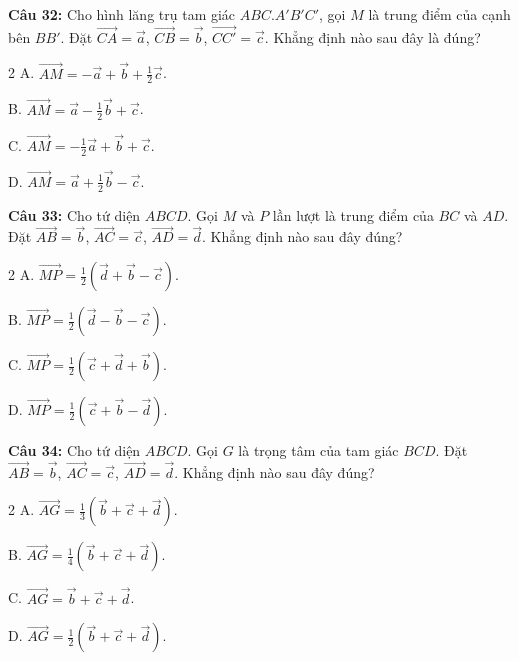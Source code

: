\documentclass[12pt]{article}
\begin{document}
	\vspace{0.2cm}
	\noindent \textbf{Câu 32:} Cho hình lăng trụ tam giác $ABC.A'B'C'$, gọi $M$ là trung điểm của cạnh bên $BB'$. Đặt $\overrightarrow{CA} = \vec{a}$, $\overrightarrow{CB} = \vec{b}$, $\overrightarrow{CC'} = \vec{c}$. Khẳng định nào sau đây là đúng?
	\begin{multicols}{2}
		A. $\overrightarrow{AM} = -\vec{a} + \vec{b} + \frac{1}{2}\vec{c}$. \par
		B. $\overrightarrow{AM} = \vec{a} - \frac{1}{2}\vec{b} + \vec{c}$. \par
		C. $\overrightarrow{AM} = -\frac{1}{2}\vec{a} + \vec{b} + \vec{c}$. \par
		D. $\overrightarrow{AM} = \vec{a} + \frac{1}{2}\vec{b} - \vec{c}$.
	\end{multicols}
	
	\vspace{0.2cm}
	\noindent \textbf{Câu 33:} Cho tứ diện $ABCD$. Gọi $M$ và $P$ lần lượt là trung điểm của $BC$ và $AD$. Đặt $\overrightarrow{AB} = \vec{b}$, $\overrightarrow{AC} = \vec{c}$, $\overrightarrow{AD} = \vec{d}$. Khẳng định nào sau đây đúng?
	\begin{multicols}{2}
		A. $\overrightarrow{MP} = \frac{1}{2}(\vec{d} + \vec{b} - \vec{c})$. \par
		B. $\overrightarrow{MP} = \frac{1}{2}(\vec{d} - \vec{b} - \vec{c})$. \par
		C. $\overrightarrow{MP} = \frac{1}{2}(\vec{c} + \vec{d} + \vec{b})$. \par
		D. $\overrightarrow{MP} = \frac{1}{2}(\vec{c} + \vec{b} - \vec{d})$.
	\end{multicols}
	
	\vspace{0.2cm}
	\noindent \textbf{Câu 34:} Cho tứ diện $ABCD$. Gọi $G$ là trọng tâm của tam giác $BCD$. Đặt $\overrightarrow{AB} = \vec{b}$, $\overrightarrow{AC} = \vec{c}$, $\overrightarrow{AD} = \vec{d}$. Khẳng định nào sau đây đúng?
	\begin{multicols}{2}
		A. $\overrightarrow{AG} = \frac{1}{3}(\vec{b} + \vec{c} + \vec{d})$. \par
		B. $\overrightarrow{AG} = \frac{1}{4}(\vec{b} + \vec{c} + \vec{d})$. \par
		C. $\overrightarrow{AG} = \vec{b} + \vec{c} + \vec{d}$. \par
		D. $\overrightarrow{AG} = \frac{1}{2}(\vec{b} + \vec{c} + \vec{d})$.
	\end{multicols}
	
\end{document}
